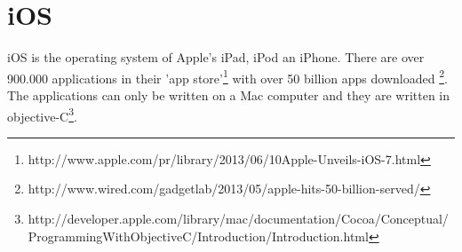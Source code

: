 \section{iOS}
iOS is the operating system of Apple's iPad, iPod an iPhone. There are over 900.000 applications in their 'app store'\footnote{http://www.apple.com/pr/library/2013/06/10Apple-Unveils-iOS-7.html} with over 50 billion apps downloaded \footnote{http://www.wired.com/gadgetlab/2013/05/apple-hits-50-billion-served/}. The applications can only be written on a Mac computer and they are written in objective-C\footnote{http://developer.apple.com/library/mac/documentation/Cocoa/Conceptual/ProgrammingWithObjectiveC/Introduction/Introduction.html}.
